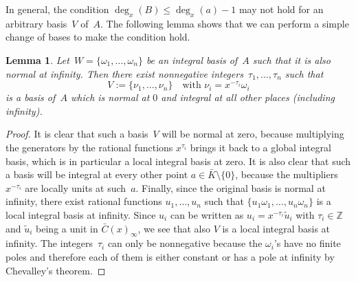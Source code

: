 \documentclass{sig-alternate}
\newtheorem{lemma}[theorem]{Lemma}
\let\set\mathbb
\begin{document}
In general, the condition $\deg_x(B) \leq \deg_x(a)-1$ may not hold for an arbitrary basis~$V$ of~$A$.
The following lemma shows that we can perform a simple change of bases to make the condition hold.

\begin{lemma}\label{LM:CB}
Let~$W =\{\omega_1, \ldots, \omega_n\}$ be an integral basis of~$A$ such that it is also normal at infinity. Then
there exist nonnegative integers~$\tau_1, \ldots, \tau_n$ such that
\[ V := \{\nu_1, \ldots, \nu_n\} \quad \text{with $\nu_i = x^{-\tau_i} \omega_i$}\]
is a basis of~$A$ which is normal at $0$ and integral at all other places (including infinity).
\end{lemma}
\begin{proof}
It is clear that such a basis~$V$ will be normal at zero, because multiplying the generators by
the rational functions $x^{\tau_i}$ brings it back to a global integral basis, which is in particular
a local integral basis at zero.
It is also clear that such a basis will be integral at every other point $a\in\bar K\setminus\{0\}$, because the
multipliers $x^{-\tau_i}$ are locally units at such~$a$.
Finally, since the original basis is normal at infinity, there exist rational functions $u_1,\dots,u_n$
such that $\{u_1\omega_1,\dots,u_n\omega_n\}$ is a local integral basis at infinity.
Since $u_i$ can be written as $u_i=x^{-\tau_i}\tilde{u}_i$ with $\tau_i\in\set Z$ and $\tilde{u}_i$ being a unit
in $\bar{C}(x)_\infty$, we see that also $V$ is a local integral basis at infinity.
The integers~$\tau_i$ can only be nonnegative because the $\omega_i$'s have no finite poles and therefore each
of them is either constant or has a pole at infinity by Chevalley's theorem.
\end{proof}
\end{document}
